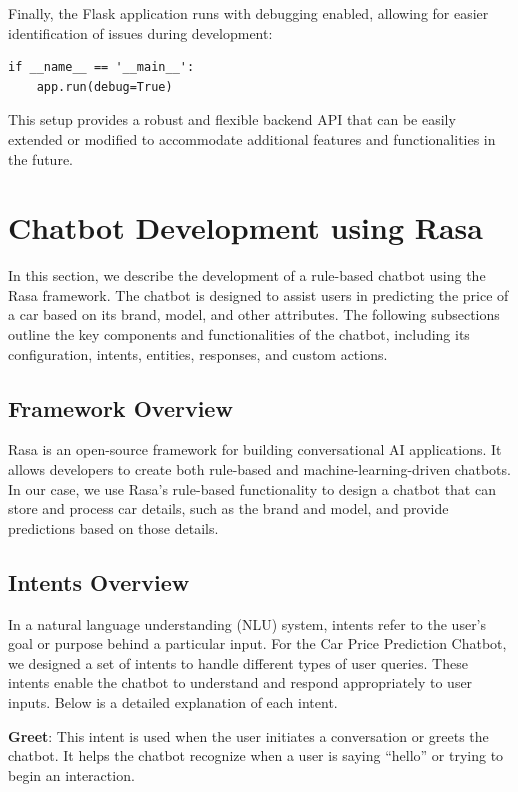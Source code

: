 \documentclass[a4paper,12pt]{article}
\begin{document}
\begin{justify}
Finally, the Flask application runs with debugging enabled, allowing for easier identification of issues during development:

\begin{verbatim}
if __name__ == '__main__':
    app.run(debug=True)
\end{verbatim}

This setup provides a robust and flexible backend API that can be easily extended or modified to accommodate additional features and functionalities in the future.


\end{justify}

\section{Chatbot Development using Rasa}
In this section, we describe the development of a rule-based chatbot using the Rasa framework. The chatbot is designed to assist users in predicting the price of a car based on its brand, model, and other attributes. The following subsections outline the key components and functionalities of the chatbot, including its configuration, intents, entities, responses, and custom actions.

\subsection{Framework Overview}
Rasa is an open-source framework for building conversational AI applications. It allows developers to create both rule-based and machine-learning-driven chatbots. In our case, we use Rasa's rule-based functionality to design a chatbot that can store and process car details, such as the brand and model, and provide predictions based on those details.

\subsection{Intents Overview}

In a natural language understanding (NLU) system, intents refer to the user’s goal or purpose behind a particular input. For the Car Price Prediction Chatbot, we designed a set of intents to handle different types of user queries. These intents enable the chatbot to understand and respond appropriately to user inputs. Below is a detailed explanation of each intent.

\textbf{Greet}: This intent is used when the user initiates a conversation or greets the chatbot. It helps the chatbot recognize when a user is saying “hello” or trying to begin an interaction.
\end{document}
